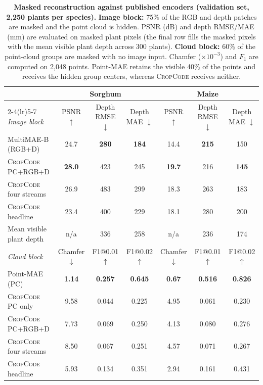 \documentclass[10pt,twocolumn,letterpaper]{article}
\newcommand{\method}{\textup{\textsc{CropCode}}}   %
\begin{document}
\begin{table}[t]
  \caption{\textbf{Masked reconstruction against published encoders (validation set, 2{,}250 plants per species).} \textbf{Image block:} 75\% of the RGB and depth patches are masked and the point cloud is hidden. PSNR (dB) and depth RMSE/MAE (mm) are evaluated on masked plant pixels (the final row fills the masked pixels with the mean visible plant depth across 300 plants). \textbf{Cloud block:} 60\% of the point-cloud groups are masked with no image input. Chamfer ($\times 10^{-3}$) and $F_1$ are computed on 2{,}048 points. Point-MAE retains the visible 40\% of the points and receives the hidden group centers, whereas \method{} receives neither.}
  \label{tab:supp-recon}
  \centering\scriptsize
  \setlength{\tabcolsep}{3pt}
  {%
  \begin{tabular}{l ccc ccc}
    \toprule
    & \multicolumn{3}{c}{Sorghum} & \multicolumn{3}{c}{Maize} \\
    \cmidrule(lr){2-4}\cmidrule(lr){5-7}
    \emph{Image block} & PSNR $\uparrow$ & Depth RMSE $\downarrow$ & Depth MAE $\downarrow$ & PSNR $\uparrow$ & Depth RMSE $\downarrow$ & Depth MAE $\downarrow$ \\
    \midrule
    MultiMAE-B (RGB+D) & 24.7 & \textbf{280} & \textbf{184} & 14.4 & \textbf{215} & 150 \\
    \method{} PC+RGB+D & \textbf{28.0} & 423 & 245 & \textbf{19.7} & 216 & \textbf{145} \\
    \method{} four streams & 26.9 & 483 & 299 & 18.3 & 263 & 183 \\
    \method{} headline & 23.4 & 400 & 229 & 18.1 & 280 & 200 \\
    Mean visible plant depth & n/a & 336 & 258 & n/a & 236 & 174 \\
    \midrule
    \emph{Cloud block} & Chamfer $\downarrow$ & F1@0.01 $\uparrow$ & F1@0.02 $\uparrow$ & Chamfer $\downarrow$ & F1@0.01 $\uparrow$ & F1@0.02 $\uparrow$ \\
    \midrule
    Point-MAE (PC) & \textbf{1.14} & \textbf{0.257} & \textbf{0.645} & \textbf{0.67} & \textbf{0.516} & \textbf{0.826} \\
    \method{} PC only & 9.58 & 0.044 & 0.225 & 4.95 & 0.061 & 0.230 \\
    \method{} PC+RGB+D & 7.73 & 0.069 & 0.250 & 4.13 & 0.080 & 0.276 \\
    \method{} four streams & 8.50 & 0.067 & 0.251 & 4.57 & 0.071 & 0.267 \\
    \method{} headline & 5.93 & 0.134 & 0.351 & 2.94 & 0.161 & 0.431 \\
    \bottomrule
  \end{tabular}}
\end{table}
\end{document}
